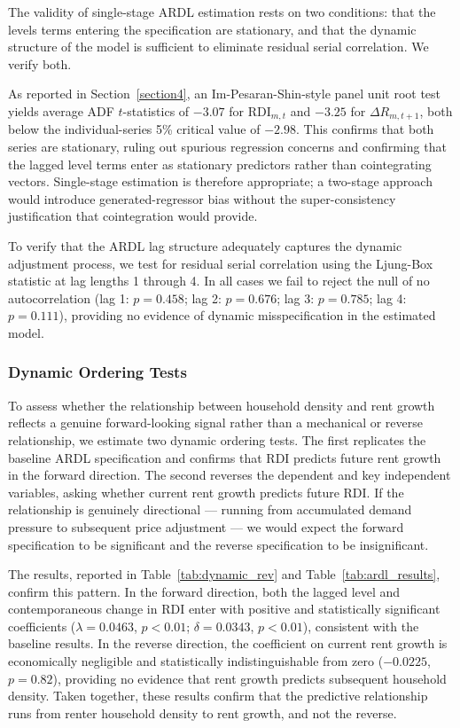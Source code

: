 \documentclass[pdflatex,sn-basic]{sn-jnl}%
\theoremstyle{thmstyleone}%
\theoremstyle{thmstyletwo}%
\theoremstyle{thmstylethree}%
\begin{document}
The validity of single-stage ARDL estimation rests on two conditions: that the 
levels terms entering the specification are stationary, and that the dynamic 
structure of the model is sufficient to eliminate residual serial correlation. 
We verify both.

As reported in Section~\ref{section4}, an Im-Pesaran-Shin-style panel unit 
root test yields average ADF $t$-statistics of $-3.07$ for $\text{RDI}_{m,t}$ 
and $-3.25$ for $\Delta R_{m,t+1}$, both below the individual-series 5\% 
critical value of $-2.98$. This confirms that both series are stationary, 
ruling out spurious regression concerns and confirming that the lagged level 
terms enter as stationary predictors rather than cointegrating vectors. 
Single-stage estimation is therefore appropriate; a two-stage approach would 
introduce generated-regressor bias without the super-consistency justification 
that cointegration would provide.

To verify that the ARDL lag structure adequately captures the dynamic 
adjustment process, we test for residual serial correlation using the 
Ljung-Box statistic at lag lengths 1 through 4. In all cases we fail to reject 
the null of no autocorrelation (lag 1: $p = 0.458$; lag 2: $p = 0.676$; 
lag 3: $p = 0.785$; lag 4: $p = 0.111$), providing no evidence of dynamic 
misspecification in the estimated model.

\subsubsection{Dynamic Ordering Tests}

To assess whether the relationship between household density and rent growth 
reflects a genuine forward-looking signal rather than a mechanical or reverse 
relationship, we estimate two dynamic ordering tests. The first replicates the 
baseline ARDL specification and confirms that RDI predicts future rent growth 
in the forward direction. The second reverses the dependent and key independent 
variables, asking whether current rent growth predicts future RDI. If the 
relationship is genuinely directional --- running from accumulated demand 
pressure to subsequent price adjustment --- we would expect the forward 
specification to be significant and the reverse specification to be 
insignificant.

The results, reported in Table~\ref{tab:dynamic_rev} and Table~\ref{tab:ardl_results}, confirm this pattern. In the forward direction, both 
the lagged level and contemporaneous change in RDI enter with positive and 
statistically significant coefficients ($\lambda = 0.0463$, $p < 0.01$; 
$\delta = 0.0343$, $p < 0.01$), consistent with the baseline results. In the 
reverse direction, the coefficient on current rent growth is economically 
negligible and statistically indistinguishable from zero ($-0.0225$, $p = 
0.82$), providing no evidence that rent growth predicts subsequent household 
density. Taken together, these results confirm that the predictive relationship 
runs from renter household density to rent growth, and not the reverse.
\end{document}
